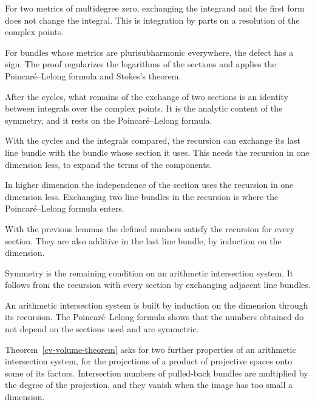 For two metrics of multidegree zero, exchanging the integrand and the first form does not change the integral. This is
integration by parts on a resolution of the complex points.

For bundles whose metrics are plurisubharmonic everywhere, the defect has a sign. The proof regularizes the logarithms of
the sections and applies the Poincar\'e--Lelong formula and Stokes's theorem.

After the cycles, what remains of the exchange of two sections is an identity between integrals over the complex
points. It is the analytic content of the symmetry, and it rests on the Poincar\'e--Lelong formula.

With the cycles and the integrals compared, the recursion can exchange its last line bundle with the bundle whose
section it uses. This needs the recursion in one dimension less, to expand the terms of the components.

In higher dimension the independence of the section uses the recursion in one dimension less. Exchanging two line
bundles in the recursion is where the Poincar\'e--Lelong formula enters.

With the previous lemmas the defined numbers satisfy the recursion for every section. They are also additive in the
last line bundle, by induction on the dimension.

Symmetry is the remaining condition on an arithmetic intersection system. It follows from the recursion with every
section by exchanging adjacent line bundles.

An arithmetic intersection system is built by induction on the dimension through its recursion. The
Poincar\'e--Lelong formula shows that the numbers obtained do not depend on the sections used and are symmetric.

Theorem~\ref{cv-volume-theorem} asks for two further properties of an arithmetic intersection system, for the
projections of a product of projective spaces onto some of its factors. Intersection numbers of pulled-back bundles
are multiplied by the degree of the projection, and they vanish when the image has too small a dimension.

